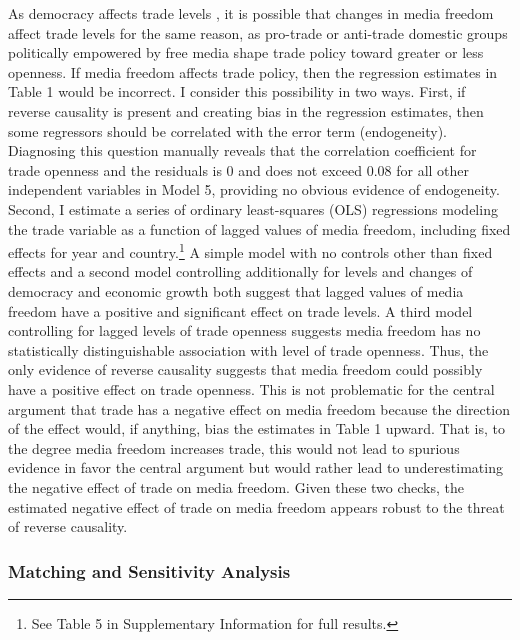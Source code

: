 \documentclass[12pt,a4paper]{article}\usepackage[]{graphicx}\usepackage[]{color}
\begin{document}
As democracy affects trade levels \parencite{Milner:2005ci}, it is possible that changes in media freedom affect trade levels for the same reason, as pro-trade or anti-trade domestic groups politically empowered by free media shape trade policy toward greater or less openness. If media freedom affects trade policy, then the regression estimates in Table 1 would be incorrect. I consider this possibility in two ways. First, if reverse causality is present and creating bias in the regression estimates, then some regressors should be correlated with the error term (endogeneity). Diagnosing this question manually reveals that the correlation coefficient for trade openness and the residuals is 0 and does not exceed 0.08 for all other independent variables in Model 5, providing no obvious evidence of endogeneity. Second, I estimate a series of ordinary least-squares (OLS) regressions modeling the trade variable as a function of lagged values of media freedom, including fixed effects for year and country.\footnote{See Table 5 in Supplementary Information for full results.} A simple model with no controls other than fixed effects and a second model controlling additionally for levels and changes of democracy and economic growth both suggest that lagged values of media freedom have a positive and significant effect on trade levels. A third model controlling for lagged levels of trade openness suggests media freedom has no statistically distinguishable association with level of trade openness. Thus, the only evidence of reverse causality suggests that media freedom could possibly have a positive effect on trade openness. This is not problematic for the central argument that trade has a negative effect on media freedom because the direction of the effect would, if anything, bias the estimates in Table 1 upward. That is, to the degree media freedom increases trade, this would not lead to spurious evidence in favor the central argument but would rather lead to underestimating the negative effect of trade on media freedom. Given these two checks, the estimated negative effect of trade on media freedom appears robust to the threat of reverse causality.

\subsubsection{Matching and Sensitivity Analysis}
\end{document}
